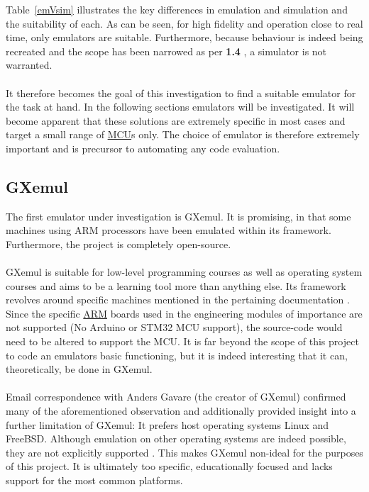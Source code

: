 Table~\ref{emVsim} illustrates the key differences in emulation and simulation and the suitability of each. As can be seen, for high fidelity and operation close to real time, only emulators are suitable. Furthermore, because behaviour is indeed being recreated and the scope has been narrowed as per \textbf{1.4 }, a simulator is not warranted. 
\\\\
It therefore becomes the goal of this investigation to find a suitable emulator for the task at hand. In the following sections emulators will be investigated. It will become apparent that these solutions are extremely specific in most cases and target a small range of \hyperref[listAbr]{MCU}s only. The choice of emulator is therefore extremely important and is precursor to automating any code evaluation.

\subsection{GXemul}
\label{GXemul}
The first emulator under investigation is GXemul. It is promising, in that some machines using ARM processors have been emulated within its framework. Furthermore, the project is completely open-source. \cite{Gavare}
\\\\
GXemul is suitable for low-level programming courses as well as operating system courses and aims to be a learning tool more than anything else. Its framework revolves around specific machines mentioned in the pertaining documentation \cite{Gavare}\cite{gavareEmail}. Since the specific \hyperref[listAbr]{ARM} boards used in the engineering modules of importance are not supported (No Arduino or STM32 MCU support), the source-code would need to be altered to support the MCU. It is far beyond the scope of this project to code an emulators basic functioning, but it is indeed interesting that it can, theoretically, be done in GXemul.
\\\\
Email correspondence with Anders Gavare (the creator of GXemul) confirmed many of the aforementioned observation and additionally provided insight into a further limitation of GXemul: It prefers host operating systems Linux and FreeBSD. Although emulation on other operating systems are indeed possible, they are not explicitly supported \cite{gavareEmail}. This makes GXemul non-ideal for the purposes of this project. It is ultimately too specific, educationally focused and lacks support for the most common platforms.
 
